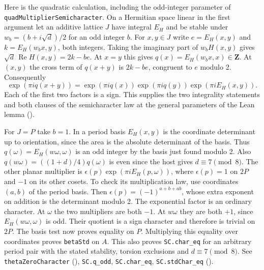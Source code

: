 Here is the quadratic calculation, including the odd-integer parameter
of \nolinkurl{quadMultiplierSemicharacter}. On a Hermitian space linear
in the first argument let an additive lattice $J$ have integral $E_H$ and
be stable under $w_b=(b+i\sqrt d)/2$ for an odd integer $b$. For $x,y\in J$
write $e=E_H(x,y)$ and $k=E_H(w_bx,y)$, both integers. Taking the
imaginary part of $w_b H(x,y)$ gives
$\sqrt d\,\operatorname{Re}H(x,y)=2k-be$. At $x=y$ this gives
$q(x)=E_H(w_bx,x)\in\mathbf Z$. At $(x,y)$ the cross term of
$q(x+y)$ is $2k-be$, congruent to $e$ modulo 2. Consequently
\[
 \exp(\pi i q(x+y))=\exp(\pi i q(x))\exp(\pi i q(y))
                      \exp(\pi i E_H(x,y)).
\]
Each of the first two factors is a sign. This supplies the two
integrality statements and both clauses of the semicharacter law at
the general parameters of the Lean lemma
().

For $J=P$ take $b=1$. In a period basis $E_H(x,y)$ is the coordinate
determinant up to orientation, since the area is the absolute
determinant of the basis. Thus $q(\omega)=E_H(w\omega,\omega)$ is an
odd integer by the basis just found modulo 2. Also
$q(w\omega)=((1+d)/4)q(\omega)$ is even since the host gives
$d\equiv7\pmod8$. The other planar multiplier is
$\epsilon(p)\exp(\pi i E_H(p,\omega))$, where $\epsilon(p)=1$
on $2P$ and $-1$ on its other cosets. To check its multiplication
law, use coordinates $(a,b)$ of the period basis. Then
$\epsilon(p)=(-1)^{a+b+ab}$, whose extra exponent on addition is the
determinant modulo 2. The exponential factor is an ordinary character.
At $\omega$ the two multipliers are both $-1$. At $w\omega$ they
are both $+1$, since $E_H(w\omega,\omega)$ is odd. Their quotient is a
sign character and therefore is trivial on $2P$. The basis test now
proves equality on $P$. Multiplying this equality over coordinates
proves \nolinkurl{betaStd} on $A$. This also proves \nolinkurl{SC.char_eq}
for an arbitrary period pair with the stated stability, torsion
exclusions and $d\equiv7\pmod8$. See \nolinkurl{thetaZeroCharacter}
(),
\nolinkurl{SC.q_odd}, \nolinkurl{SC.char_eq}, \nolinkurl{SC.stdChar_eq}
().

